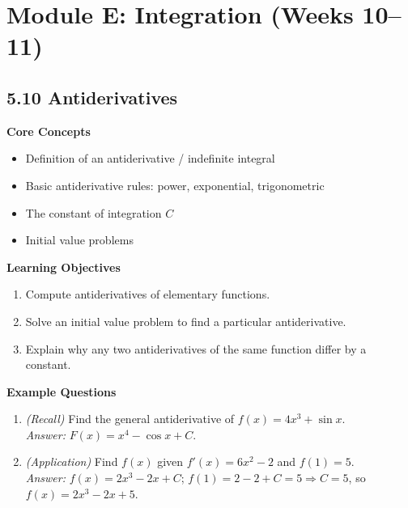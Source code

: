 \documentclass[11pt]{article}
\begin{document}
\section{Module E: Integration (Weeks 10--11)}

\subsection{5.10 Antiderivatives}
\textbf{Core Concepts}
\begin{itemize}
\item Definition of an antiderivative / indefinite integral
\item Basic antiderivative rules: power, exponential, trigonometric
\item The constant of integration $C$
\item Initial value problems
\end{itemize}
\textbf{Learning Objectives}
\begin{enumerate}
\item Compute antiderivatives of elementary functions.
\item Solve an initial value problem to find a particular antiderivative.
\item Explain why any two antiderivatives of the same function differ by a constant.
\end{enumerate}
\textbf{Example Questions}
\begin{enumerate}
\item \emph{(Recall)} Find the general antiderivative of $f(x) = 4x^3 + \sin x$. \\
\textit{Answer:} $F(x) = x^4 - \cos x + C$.
\item \emph{(Application)} Find $f(x)$ given $f'(x) = 6x^2 - 2$ and $f(1) = 5$. \\
\textit{Answer:} $f(x) = 2x^3-2x+C$; $f(1)=2-2+C=5\Rightarrow C=5$, so $f(x)=2x^3-2x+5$.
\end{enumerate}
\end{document}

